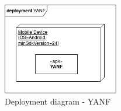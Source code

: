 \documentclass[main.tex]{subfiles}
\begin{document}
\begin{figure}[H]
    \centering
    \includegraphics[width=0.45\textwidth]{Images/Diagrams/deployment.png}
    \caption{Deployment diagram - YANF}
    \label{fig:deployment}
\end{figure}
\end{document}

